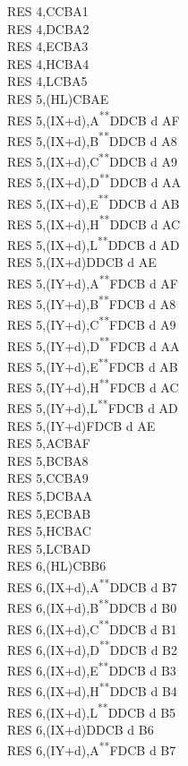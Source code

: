 \documentclass[twoside,openright,a4paper]{book}
\newcommand{\UNDOC}{\textnormal{\textsuperscript{**}}}
\begin{document}
\begin{multicols}{3}
{\begin{tabbing}
	RES 4,C\>CBA1\\
	RES 4,D\>CBA2\\
	RES 4,E\>CBA3\\
	RES 4,H\>CBA4\\
	RES 4,L\>CBA5\\
	RES 5,(HL)\>CBAE\\
	RES 5,(IX+d),A\UNDOC\>DDCB d AF\\
	RES 5,(IX+d),B\UNDOC\>DDCB d A8\\
	RES 5,(IX+d),C\UNDOC\>DDCB d A9\\
	RES 5,(IX+d),D\UNDOC\>DDCB d AA\\
	RES 5,(IX+d),E\UNDOC\>DDCB d AB\\
	RES 5,(IX+d),H\UNDOC\>DDCB d AC\\
	RES 5,(IX+d),L\UNDOC\>DDCB d AD\\
	RES 5,(IX+d)\>DDCB d AE\\
	RES 5,(IY+d),A\UNDOC\>FDCB d AF\\
	RES 5,(IY+d),B\UNDOC\>FDCB d A8\\
	RES 5,(IY+d),C\UNDOC\>FDCB d A9\\
	RES 5,(IY+d),D\UNDOC\>FDCB d AA\\
	RES 5,(IY+d),E\UNDOC\>FDCB d AB\\
	RES 5,(IY+d),H\UNDOC\>FDCB d AC\\
	RES 5,(IY+d),L\UNDOC\>FDCB d AD\\
	RES 5,(IY+d)\>FDCB d AE\\
	RES 5,A\>CBAF\\
	RES 5,B\>CBA8\\
	RES 5,C\>CBA9\\
	RES 5,D\>CBAA\\
	RES 5,E\>CBAB\\
	RES 5,H\>CBAC\\
	RES 5,L\>CBAD\\
	RES 6,(HL)\>CBB6\\
	RES 6,(IX+d),A\UNDOC\>DDCB d B7\\
	RES 6,(IX+d),B\UNDOC\>DDCB d B0\\
	RES 6,(IX+d),C\UNDOC\>DDCB d B1\\
	RES 6,(IX+d),D\UNDOC\>DDCB d B2\\
	RES 6,(IX+d),E\UNDOC\>DDCB d B3\\
	RES 6,(IX+d),H\UNDOC\>DDCB d B4\\
	RES 6,(IX+d),L\UNDOC\>DDCB d B5\\
	RES 6,(IX+d)\>DDCB d B6\\
	RES 6,(IY+d),A\UNDOC\>FDCB d B7\\

\end{tabbing}}
\end{multicols}
\end{document}
